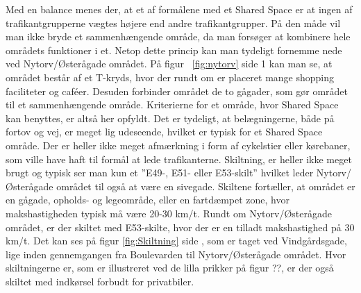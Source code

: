 Med en balance menes der, at et af formålene med et Shared Space er at ingen af trafikantgrupperne vægtes højere end andre trafikantgrupper. På den måde vil man ikke bryde et sammenhængende område, da man forsøger at kombinere hele områdets funktioner i et. Netop dette princip kan man tydeligt fornemme nede ved Nytorv/Østerågade området.  På figur ~\cref{fig:nytorv} side \pageref*{fig:nytorv} 1 kan man se, at området består af et T-kryds, hvor der rundt om er placeret mange shopping faciliteter og caféer. Desuden forbinder området de to gågader, som gør området til et sammenhængende område. Kriterierne for et område, hvor Shared Space kan benyttes, er altså her opfyldt.
Det er tydeligt, at belægningerne, både på fortov og vej, er meget lig udeseende, hvilket er typisk for et Shared Space område. Der er heller ikke meget afmærkning i form af cykelstier eller kørebaner, som ville have haft til formål at lede trafikanterne. Skiltning, er heller ikke meget brugt og typisk ser man kun et ”E49-, E51- eller E53-skilt” hvilket leder Nytorv/Østerågade området til også at være en sivegade. Skiltene fortæller, at området er en gågade, opholds- og legeområde, eller en fartdæmpet zone, hvor makshastigheden typisk må være 20-30 km/t.  Rundt om Nytorv/Østerågade området, er der skiltet med E53-skilte, hvor der er en tilladt makshastighed på 30 km/t. Det kan ses på figur \cref{fig:Skiltning} side \pageref{fig:Skiltning}, som er taget ved Vindgårdsgade, lige inden gennemgangen fra Boulevarden til Nytorv/Østerågade området. Hvor skiltningerne er, som er illustreret ved de lilla prikker på figur ??, er der også skiltet med indkørsel forbudt for privatbiler. 


